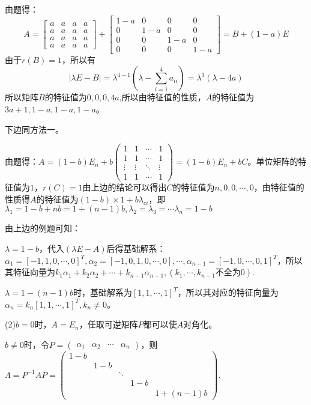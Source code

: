 \documentclass[a4paper]{report}
\begin{document}
\begin{tips}
\begin{jie}
由题得：
\begin{equation*}A=
  \begin{bmatrix}
    a & a& a& a \\
    a & a& a& a \\
    a & a& a& a \\
    a & a& a& a
  \end{bmatrix}+
   \begin{bmatrix}
    1-a & 0& 0& 0 \\
    0 & 1-a& 0& 0 \\
    0 & 0& 1-a& 0 \\
    0 & 0& 0& 1-a
  \end{bmatrix}=B+(1-a)E
\end{equation*}
由于$r(B)=1$，所以有
\begin{equation*}
  |\lambda E -B|=\lambda^{4-1}\left(\lambda-\sum\limits_{i=1}^{4}a_{ii}\right)=
  \lambda^{3}\left(\lambda-4a\right)
\end{equation*}
所以矩阵$B$的特征值为$0,0,0,4a$,所以由特征值的性质，$A$的特征值为$3a+1,1-a,1-a,1-a$。

下边同方法一。
\end{jie}
\hphantom{.}
\end{tips}

\begin{jie}
由题得：$A
=
(1-b)E_{n}+b
\begin{pmatrix}
1&1&\cdots&1\\
1&1&\cdots&1\\
\vdots&\vdots&\ddots&\vdots\\
1&1&\cdots&1
\end{pmatrix}=(1-b)E_{n}+bC
$。单位矩阵的特征值为$1$，$r(C)=1$由上边的结论可以得出$C$的特征值为$n,0,0,\cdots,0$，由特征值的性质得$A$的特征值为$(1-b)\times 1+b\lambda_{ci}$，即$\lambda_1=1-b+nb=1+(n-1)b,\lambda_2=\lambda_3=\cdots\lambda_n=1-b$

由上边的例题可知：

$\lambda=1-b$，代入$(\lambda E-A)$后得基础解系：$
\alpha_1=[-1,1,0,\cdots,0]^T,\alpha_2=[-1,0,1,0,\cdots,0],\cdots,\alpha_{n-1}=[-1,0,\cdots,0,1]^T
$，所以其特征向量为$k_1\alpha_1+k_2\alpha_2+\cdots+k_{n-1}\alpha_{n-1},(k_1,\cdots,k_{n-1}\text{不全为0})$.

$\lambda=1-(n-1)b$时，基础解系为$[1,1,\cdots,1]^T$，所以其对应的特征向量为$\alpha_n=k_{n}[1,1,\cdots,1]^T,k_n\neq 0$。

(2)$b=0$时，$A=E_n$，任取可逆矩阵$P$都可以使$A$对角化。

$b\neq 0$时，令$P=
\begin{pmatrix}
\alpha_1&\alpha_2&\cdots&\alpha_n
\end{pmatrix}
$，则$\Lambda=P^{-1}AP=
\begin{pmatrix}
1-b\\
&1-b\\
&&\ddots\\
&&&1-b\\
&&&&1+(n-1)b
\end{pmatrix}
$.
\end{jie}
\end{document}
